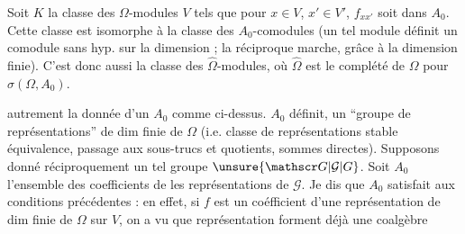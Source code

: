 Soit $K$ la classe des $\Omega$-modules $V$  tels que
pour $x\in V$, $x'\in V'$, $f_{xx'}$ soit dans $A_0$. Cette
classe est isomorphe à la classe des $A_0$-comodules
(un tel module définit un
comodule sans hyp. sur la dimension ;
la réciproque marche, grâce à la dimension
finie). C'est donc aussi la classe des
$\widehat\Omega$-modules, où $\widehat\Omega$ est le complété
 de $\Omega$ pour $\sigma(\Omega,A_0)$.

 autrement la donnée
d'un $A_0$ comme ci-dessus. $A_0$ définit, 
un ``groupe de représentations'' de dim finie
de $\Omega$ (i.e. classe de représentations stable
 équivalence, passage aux sous-trucs et
quotients, sommes directes). Supposons
donné réciproquement un tel groupe $\unsure{\mathscr G|\mathcal G|G}$.
Soit $A_0$ l'ensemble des coefficients de
 les représentations de $\mathscr G$.  Je dis
que $A_0$ satisfait aux conditions précédentes :
en effet,  si $f$ est un coéfficient d'une
représentation de dim finie de $\Omega$ sur $V$,
on a vu que 
représentation forment déjà une coalgèbre
